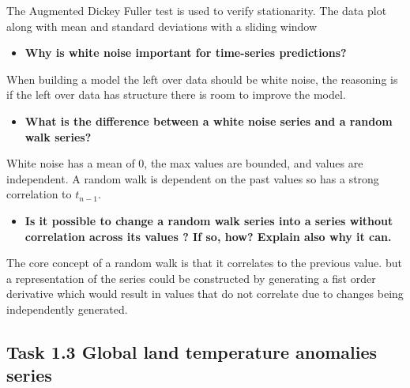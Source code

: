 \documentclass{article}
\begin{document}
The Augmented Dickey Fuller test is used to verify stationarity.
The data plot along with mean and standard deviations with a sliding window
\begin{itemize}
    \item \textbf{Why is white noise important for time-series predictions?}
\end{itemize}

When building a model the left over data should be white noise, the reasoning is if the left over data has structure there is room to improve the model.
\begin{itemize}
    \item \textbf{What is the difference between a white noise series and a random walk series?}
\end{itemize}

White noise has a mean of 0, the max values are bounded, and values are independent. A random walk is dependent on the past values so has a strong correlation to $t_{n-1}$.
\begin{itemize}
    \item \textbf{Is it possible to change a random walk series into a series without correlation across its values ? If so, how? Explain also why it can.}
\end{itemize}

The core concept of a random walk is that it correlates to the previous value. but a representation of the series could be constructed by generating a fist order derivative which would result in values that do not correlate due to changes being independently generated.


\subsection{Task 1.3 Global land temperature anomalies series}
\end{document}
